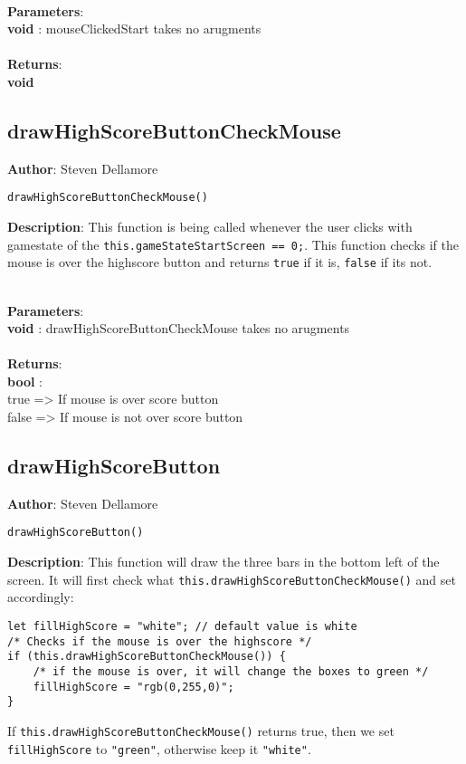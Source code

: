 \documentclass[12pt]{article}
\begin{document}
\textbf{\large{\\Parameters}}:\\
\textbf{void }: mouseClickedStart takes no arugments\\\textbf{\large{\\Returns}}:\\\textbf{void}

\subsection{drawHighScoreButtonCheckMouse}
\textbf{Author}: Steven Dellamore 
\vspace*{1\baselineskip}
\begin{lstlisting}
drawHighScoreButtonCheckMouse()
\end{lstlisting} 
\vspace*{1\baselineskip}
\textbf{Description}: This function is being called whenever the user clicks with gamestate of the \texttt{this.gameStateStartScreen == 0;}. This function checks if the mouse is over the highscore button and returns \texttt{true} if it is, \texttt{false} if its not. 


\textbf{\large{\\Parameters}}:\\
\textbf{void }: drawHighScoreButtonCheckMouse takes no arugments\\\textbf{\large{\\Returns}}:\\\textbf{bool }: \\true => If mouse is over score button \\false => If mouse is not over score button

\subsection{drawHighScoreButton}
\textbf{Author}: Steven Dellamore 
\vspace*{1\baselineskip}
\begin{lstlisting}
drawHighScoreButton()
\end{lstlisting} 
\vspace*{1\baselineskip}
\textbf{Description}: This function will draw the three bars in the bottom left of the screen. It will first check what \texttt{this.drawHighScoreButtonCheckMouse()} and set accordingly: 
\begin{verbatim}
let fillHighScore = "white"; // default value is white
/* Checks if the mouse is over the highscore */
if (this.drawHighScoreButtonCheckMouse()) { 
	/* if the mouse is over, it will change the boxes to green */
	fillHighScore = "rgb(0,255,0)"; 
}
\end{verbatim}
 If \texttt{this.drawHighScoreButtonCheckMouse()} returns true, then we set \texttt{fillHighScore} to \texttt{"green"}, otherwise keep it \texttt{"white"}. 
\end{document}
